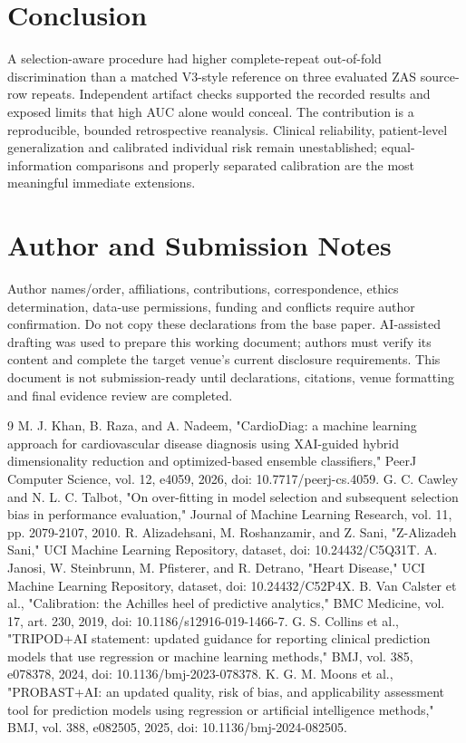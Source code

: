 \documentclass[conference]{IEEEtran}
\begin{document}
\section{Conclusion}
A selection-aware procedure had higher complete-repeat out-of-fold discrimination than a matched V3-style reference on three evaluated ZAS source-row repeats. Independent artifact checks supported the recorded results and exposed limits that high AUC alone would conceal. The contribution is a reproducible, bounded retrospective reanalysis. Clinical reliability, patient-level generalization and calibrated individual risk remain unestablished; equal-information comparisons and properly separated calibration are the most meaningful immediate extensions.

\section*{Author and Submission Notes}
Author names/order, affiliations, contributions, correspondence, ethics determination, data-use permissions, funding and conflicts require author confirmation. Do not copy these declarations from the base paper. AI-assisted drafting was used to prepare this working document; authors must verify its content and complete the target venue's current disclosure requirements. This document is not submission-ready until declarations, citations, venue formatting and final evidence review are completed.

\begin{thebibliography}{9}
 M. J. Khan, B. Raza, and A. Nadeem, "CardioDiag: a machine learning approach for cardiovascular disease diagnosis using XAI-guided hybrid dimensionality reduction and optimized-based ensemble classifiers," PeerJ Computer Science, vol. 12, e4059, 2026, doi: 10.7717/peerj-cs.4059.
 G. C. Cawley and N. L. C. Talbot, "On over-fitting in model selection and subsequent selection bias in performance evaluation," Journal of Machine Learning Research, vol. 11, pp. 2079-2107, 2010.
 R. Alizadehsani, M. Roshanzamir, and Z. Sani, "Z-Alizadeh Sani," UCI Machine Learning Repository, dataset, doi: 10.24432/C5Q31T.
 A. Janosi, W. Steinbrunn, M. Pfisterer, and R. Detrano, "Heart Disease," UCI Machine Learning Repository, dataset, doi: 10.24432/C52P4X.
 B. Van Calster et al., "Calibration: the Achilles heel of predictive analytics," BMC Medicine, vol. 17, art. 230, 2019, doi: 10.1186/s12916-019-1466-7.
 G. S. Collins et al., "TRIPOD+AI statement: updated guidance for reporting clinical prediction models that use regression or machine learning methods," BMJ, vol. 385, e078378, 2024, doi: 10.1136/bmj-2023-078378.
 K. G. M. Moons et al., "PROBAST+AI: an updated quality, risk of bias, and applicability assessment tool for prediction models using regression or artificial intelligence methods," BMJ, vol. 388, e082505, 2025, doi: 10.1136/bmj-2024-082505.
\end{thebibliography}
\end{document}
